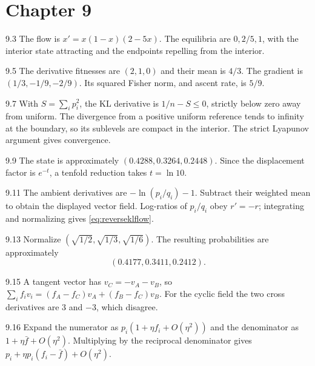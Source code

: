 \documentclass[11pt,oneside,openany]{book}
\theoremstyle{definition}
\theoremstyle{remark}
\newenvironment{answers}{\begin{description}[leftmargin=2.9em,labelwidth=2.5em,labelsep=.4em,itemsep=8pt,font=\normalfont\bfseries]}{\end{description}}
\numberwithin{equation}{chapter}
\begin{document}
\section*{Chapter 9}
\begin{answers}
\item[9.3] The flow is $x'=x(1-x)(2-5x)$. The equilibria are $0,2/5,1$, with the interior state attracting and the endpoints repelling from the interior.
\item[9.5] The derivative fitnesses are $(2,1,0)$ and their mean is $4/3$. The gradient is $(1/3,-1/9,-2/9)$. Its squared Fisher norm, and ascent rate, is $5/9$.
\item[9.7] With $S=\sum_i p_i^2$, the KL derivative is $1/n-S\leq0$, strictly below zero away from uniform. The divergence from a positive uniform reference tends to infinity at the boundary, so its sublevels are compact in the interior. The strict Lyapunov argument gives convergence.
\item[9.9] The state is approximately $(0.4288,0.3264,0.2448)$. Since the displacement factor is $e^{-t}$, a tenfold reduction takes $t=\ln10$.
\item[9.11] The ambient derivatives are $-\ln(p_i/q_i)-1$. Subtract their weighted mean to obtain the displayed vector field. Log-ratios of $p_i/q_i$ obey $r'=-r$; integrating and normalizing gives \eqref{eq:reverseklflow}.
\item[9.13] Normalize $(\sqrt{1/2},\sqrt{1/3},\sqrt{1/6})$. The resulting probabilities are approximately
\[
(0.4177,0.3411,0.2412).
\]
\item[9.15] A tangent vector has $v_C=-v_A-v_B$, so $\sum_i f_iv_i=(f_A-f_C)v_A+(f_B-f_C)v_B$. For the cyclic field the two cross derivatives are $3$ and $-3$, which disagree.
\item[9.16] Expand the numerator as $p_i(1+\eta f_i+O(\eta^2))$ and the denominator as $1+\eta\bar f+O(\eta^2)$. Multiplying by the reciprocal denominator gives $p_i+\eta p_i(f_i-\bar f)+O(\eta^2)$.
\end{answers}
\end{document}
